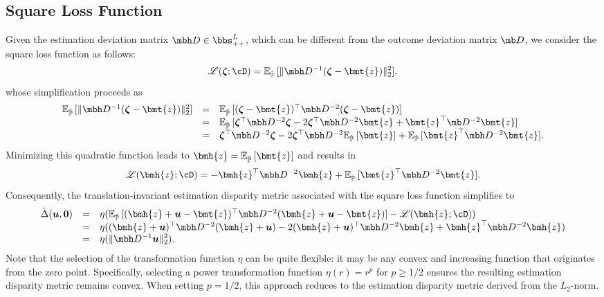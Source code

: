 \documentclass[mnsc, nonblindrev]{informswp}
\newcommand{\1}[1]{\mathds{1}{\left(#1\right)}}
\begin{document}
\subsection*{Square Loss Function}
Given the estimation deviation matrix $\mbh D \in \bbs^L_{++}$, which can be different from the outcome deviation matrix $\mb D$, we consider the square loss function as follows:
$$
\mathscr{L}(\bm{\zeta}; \cD) = \mathbb{E}_{\hat{\mathbb{P}}}\,[\|\mbh D^{-1}(\bm{\zeta} - \bmt{z})\|^2_2],
$$
whose simplification proceeds as
$$
\begin{array}{rcl}
\mathbb{E}_{\hat{\mathbb{P}}}\,[\|\mbh D^{-1}(\bm{\zeta} - \bmt{z})\|^2_2] &=& \mathbb{E}_{\hat{\mathbb{P}}}\,[(\bm{\zeta} - \bmt{z})^\top \mbh D^{-2}(\bm{\zeta} - \bmt{z})] \\
&=& \mathbb{E}_{\hat{\mathbb{P}}}\,[\bm{\zeta}^\top \mbh D^{-2} \bm{\zeta} - 2 \bm{\zeta}^\top \mbh D^{-2} \bmt{z} + \bmt{z}^\top \mb D^{-2} \bmt{z}] \\
&=& \bm{\zeta}^\top \mbh D^{-2} \bm{\zeta} - 2\bm{\zeta}^\top \mbh D^{-2} \mathbb{E}_{\hat{\mathbb{P}}}\,[\bmt{z}] + \mathbb{E}_{\hat{\mathbb{P}}}\,[\bmt{z}^\top  \mbh D^{-2} \bmt{z}].
\end{array}
$$
Minimizing this quadratic function leads to $\bmh{z} = \mathbb{E}_{\hat{\mathbb{P}}}\,[\bmt{z}]$ and results in
$$
\mathscr{L}(\bmh{z}; \cD) = -\bmh{z}^\top \mbh D^{-2} \bmh{z} + \mathbb{E}_{\hat{\mathbb{P}}}\,[\bmt{z}^\top  \mbh D^{-2}\bmt{z}].
$$
Consequently, the translation-invariant estimation disparity metric associated with the square loss function simplifies to
$$
\begin{array}{rcl}
\hat \Delta(\bm u,\bm 0) &=& \eta (\mathbb{E}_{\hat{\mathbb{P}}}\,[(\bmh{z} + \bm u - \bmt{z})^\top \mbh D^{-2}(\bmh{z} + \bm u- \bmt{z})] - \mathscr{L}(\bmh{z}; \cD)) \\
&=& \eta ((\bmh{z} + \bm{u})^\top \mbh D^{-2} (\bmh{z} + \bm u) - 2(\bmh{z} + \bm{u})^\top \mbh D^{-2} \bmh{z} + \bmh{z}^\top \mbh D^{-2} \bmh{z}) \\
&=& \eta(\|\mbh D^{-1} \bm u\|^2_2). 
\end{array}
$$
Note that the selection of the transformation function $\eta$ can be quite flexible: it may be any convex and increasing function that originates from the zero point. Specifically, selecting a power transformation function $\eta(r) = r^p$ for $p \geq 1/2$ ensures the resulting estimation disparity metric remains convex. When setting $p = 1/2$, this approach reduces to the estimation disparity metric derived from the $L_2$-norm. 
\end{document}
